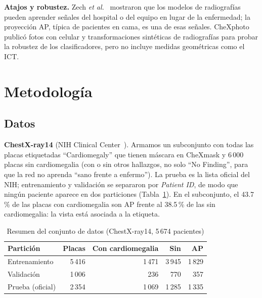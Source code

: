 \documentclass[conference]{IEEEtran}
\begin{document}
\textbf{Atajos y robustez.} Zech \emph{et al.}~\cite{zech2018confounding} mostraron que los modelos de radiografías
pueden aprender señales del hospital o del equipo en lugar de la enfermedad; la proyección AP, típica de pacientes en
cama, es una de esas señales. CheXphoto~\cite{phillips2020chexphoto} publicó fotos con celular y transformaciones
sintéticas de radiografías para probar la robustez de los clasificadores, pero no incluye medidas geométricas como el
ICT.

\section{Metodología}\label{sec:met}

\subsection{Datos}

\textbf{ChestX-ray14} (NIH Clinical Center~\cite{wang2017chestxray8}). Armamos un subconjunto con todas las placas
etiquetadas ``Cardiomegaly'' que tienen máscara en CheXmask y 6\,000 placas sin cardiomegalia (con o sin otros
hallazgos, no solo ``No Finding'', para que la red no aprenda ``sano frente a enfermo''). La prueba es la lista oficial
del NIH; entrenamiento y validación se separaron por \emph{Patient ID}, de modo que ningún paciente aparece en dos
particiones (Tabla~\ref{tab:datos}). En el subconjunto, el 43.7\,\% de las placas con cardiomegalia son AP frente al
38.5\,\% de las sin cardiomegalia: la vista está asociada a la etiqueta.

\begin{table}[t]
\caption{Resumen del conjunto de datos (ChestX-ray14, 5\,674 pacientes)}\label{tab:datos}
\centering
\begin{tabular}{lrrrr}
\toprule
Partición & Placas & Con cardiomegalia & Sin & AP \\
\midrule
Entrenamiento & 5\,416 & 1\,471 & 3\,945 & 1\,829 \\
Validación    & 1\,006 &   236 &   770 &   357 \\
Prueba (oficial) & 2\,354 & 1\,069 & 1\,285 & 1\,335 \\
\bottomrule
\end{tabular}
\end{table}
\end{document}
